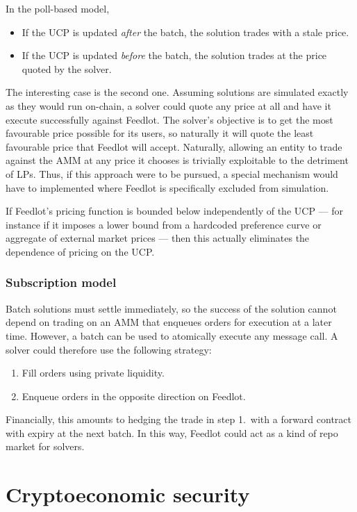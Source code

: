 \documentclass[a4paper,10pt]{article}
\begin{document}
In the poll-based model, 
\begin{itemize}
  \item If the UCP is updated \emph{after} the batch, the solution trades with a stale price.
  \item If the UCP is updated \emph{before} the batch, the solution trades at the price quoted by the solver.
\end{itemize}
The interesting case is the second one. 
%
Assuming solutions are simulated exactly as they would run on-chain, a solver could quote any price at all and have it execute successfully against Feedlot.
%
The solver's objective is to get the most favourable price possible for its users, so naturally it will quote the least favourable price that Feedlot will accept.
%
Naturally, allowing an entity to trade against the AMM at any price it chooses is trivially exploitable to the detriment of LPs.
%
Thus, if this approach were to be pursued, a special mechanism would have to implemented where Feedlot is specifically excluded from simulation.

If Feedlot's pricing function is bounded below independently of the UCP --- for instance if it imposes a lower bound from a hardcoded preference curve or aggregate of external market prices --- then this actually eliminates the dependence of pricing on the UCP.

\subsubsection{Subscription model}

Batch solutions must settle immediately, so the success of the solution cannot depend on trading on an AMM that enqueues orders for execution at a later time.
%
However, a batch can be used to atomically execute any message call.
%
A solver could therefore use the following strategy:
\begin{enumerate}
  \item Fill orders using private liquidity.
  \item Enqueue orders in the opposite direction on Feedlot.
\end{enumerate}
Financially, this amounts to hedging the trade in step 1.~with a forward contract with expiry at the next batch.
%
In this way, Feedlot could act as a kind of repo market for solvers.

\section{Cryptoeconomic security}
\end{document}
